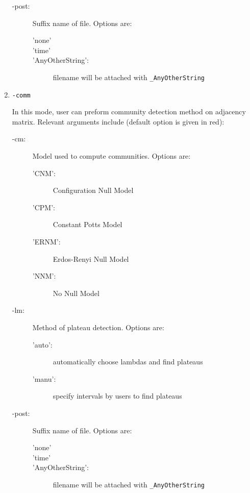 \documentclass[11pt]{article}
\begin{document}
\begin{enumerate}[{\bf (1)}]
\begin{description}
	\vspace{0.5cm}

	\item[-post:] Suffix name of file. Options are:
		\begin{description}
			\item['none'] 
			\item['time']
			\item['AnyOtherString':] filename will be attached with {\tt \_AnyOtherString}  
		\end{description}
\end{description}
\vspace{0.5cm}

\item {\tt -comm} 

In this mode, user can preform community detection method on adjacency matrix. Relevant arguments include (default option is given in red):
	\begin{description}
	
		\item[-cm:] Model used to compute communities. Options are:
			\begin{description}
				\item['CNM':] Configuration Null Model
				\item['CPM':] Constant Potts Model
				\item['ERNM':] Erdos-Renyi Null Model
				\item['NNM':] No Null Model
			\end{description}
	
		\item[-lm:] Method of plateau detection. Options are:
			\begin{description}
				\item['auto':] automatically choose lambdas and find plateaus
				\item['manu':] specify intervals by users to find plateaus
			\end{description}

		\item[-post:] Suffix name of file. Options are:
			\begin{description}
				\item['none'] 
				\item['time']
				\item['AnyOtherString':] filename will be attached with {\tt \_AnyOtherString}  
			\end{description}

	\vspace{0.5cm}


\end{description}
\end{enumerate}
\end{document}
